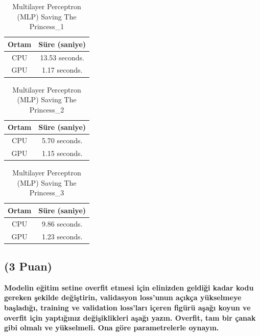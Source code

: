 \documentclass[11pt]{article}
\begin{document}
\begin{table}[ht!]
    \centering
    \caption{Multilayer Perceptron (MLP) Saving The Princess_1}
    \begin{tabular}{c|c}
        Ortam & Süre (saniye) \\\hline
        CPU & 13.53 seconds. \\ 
        GPU & 1.17 seconds.\\
    \end{tabular}
    \label{tab:my_table}
\end{table}

\begin{table}[ht!]
    \centering
    \caption{Multilayer Perceptron (MLP) Saving The Princess_2}
    \begin{tabular}{c|c}
        Ortam & Süre (saniye) \\\hline
        CPU & 5.70 seconds. \\ 
        GPU & 1.15 seconds.\\
    \end{tabular}
    \label{tab:my_table}
\end{table}

\begin{table}[ht!]
    \centering
    \caption{Multilayer Perceptron (MLP) Saving The Princess_3}
    \begin{tabular}{c|c}
        Ortam & Süre (saniye) \\\hline
        CPU & 9.86 seconds. \\ 
        GPU & 1.23 seconds.\\
    \end{tabular}
    \label{tab:my_table}
\end{table}
\subsection{(3 Puan)} \textbf{Modelin eğitim setine overfit etmesi için elinizden geldiği kadar kodu gereken şekilde değiştirin, validasyon loss'unun açıkça yükselmeye başladığı, training ve validation loss'ları içeren figürü aşağı koyun ve overfit için yaptığınız değişiklikleri aşağı yazın. Overfit, tam bir çanak gibi olmalı ve yükselmeli. Ona göre parametrelerle oynayın.}
\end{document}
